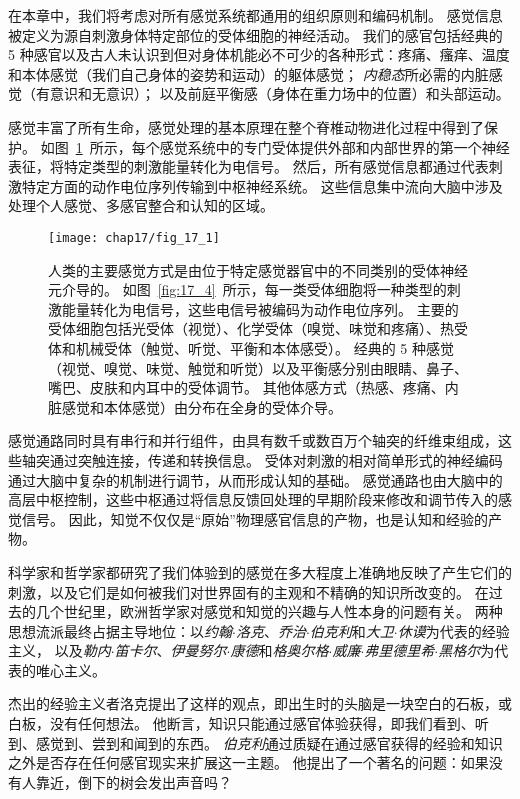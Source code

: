在本章中，我们将考虑对所有感觉系统都通用的组织原则和编码机制。 
感觉信息被定义为源自刺激身体特定部位的受体细胞的神经活动。 
我们的感官包括经典的 5 种感官以及古人未认识到但对身体机能必不可少的各种形式：疼痛、瘙痒、温度和本体感觉（我们自己身体的姿势和运动）的躯体感觉；
\textit{内稳态}所必需的内脏感觉（有意识和无意识）； 
以及前庭平衡感（身体在重力场中的位置）和头部运动。


感觉丰富了所有生命，感觉处理的基本原理在整个脊椎动物进化过程中得到了保护。
如图~\ref{fig:17_1}~所示，每个感觉系统中的专门受体提供外部和内部世界的第一个神经表征，将特定类型的刺激能量转化为电信号。
然后，所有感觉信息都通过代表刺激特定方面的动作电位序列传输到中枢神经系统。
这些信息集中流向大脑中涉及处理个人感觉、多感官整合和认知的区域。


\begin{figure}[htbp]
	\centering
	\texttt{[image: chap17/fig\_17\_1]}
	\caption{人类的主要感觉方式是由位于特定感觉器官中的不同类别的受体神经元介导的。 
		如图~\ref{fig:17_4}~所示，每一类受体细胞将一种类型的刺激能量转化为电信号，这些电信号被编码为动作电位序列。
		主要的受体细胞包括光受体（视觉）、化学受体（嗅觉、味觉和疼痛）、热受体和机械受体（触觉、听觉、平衡和本体感受）。 
		经典的 5 种感觉（视觉、嗅觉、味觉、触觉和听觉）以及平衡感分别由眼睛、鼻子、嘴巴、皮肤和内耳中的受体调节。
		其他体感方式（热感、疼痛、内脏感觉和本体感觉）由分布在全身的受体介导。}
	\label{fig:17_1}
\end{figure}



感觉通路同时具有串行和并行组件，由具有数千或数百万个轴突的纤维束组成，这些轴突通过突触连接，传递和转换信息。 
受体对刺激的相对简单形式的神经编码通过大脑中复杂的机制进行调节，从而形成认知的基础。 
感觉通路也由大脑中的高层中枢控制，这些中枢通过将信息反馈回处理的早期阶段来修改和调节传入的感觉信号。 
因此，知觉不仅仅是“原始”物理感官信息的产物，也是认知和经验的产物。


科学家和哲学家都研究了我们体验到的感觉在多大程度上准确地反映了产生它们的刺激，以及它们是如何被我们对世界固有的主观和不精确的知识所改变的。 
在过去的几个世纪里，欧洲哲学家对感觉和知觉的兴趣与人性本身的问题有关。 
两种思想流派最终占据主导地位：以\textit{约翰$\cdot$洛克}、\textit{乔治$\cdot$伯克利}和\textit{大卫$\cdot$休谟}为代表的经验主义，
以及\textit{勒内$\cdot$笛卡尔}、\textit{伊曼努尔$\cdot$康德}和\textit{格奥尔格$\cdot$威廉$\cdot$弗里德里希$\cdot$黑格尔}为代表的唯心主义。


杰出的经验主义者洛克提出了这样的观点，即出生时的头脑是一块空白的石板，或白板，没有任何想法。
他断言，知识只能通过感官体验获得，即我们看到、听到、感觉到、尝到和闻到的东西。
\textit{伯克利}通过质疑在通过感官获得的经验和知识之外是否存在任何感官现实来扩展这一主题。
他提出了一个著名的问题：如果没有人靠近，倒下的树会发出声音吗？


